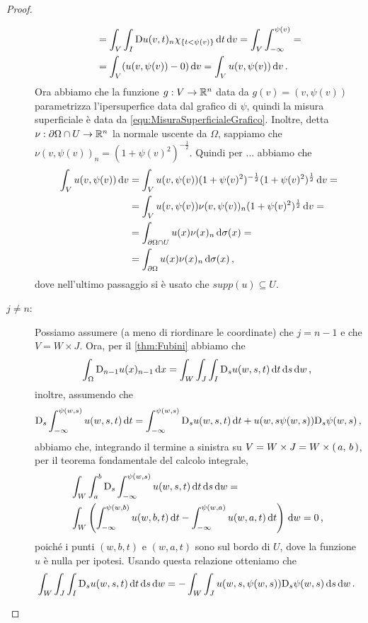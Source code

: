\begin{proof}
\begin{description}
\begin{align*}
				& = \int_V \int_I \mathrm D u(v,t)_n \chi_{\{t<\psi(v)\}} \,\mathrm d t \,\mathrm d v = \int_V \int_{-\infty}^{\psi(v)} = \\
				& = \int_V (u(v,\psi(v)) - 0) \,\mathrm d v = \int_V u(v,\psi(v)) \,\mathrm d v\, \text{. }
			\end{align*}
			Ora abbiamo che la funzione $g:V\rightarrow \mathbb R^n$ data da $g(v)=(v,\psi(v))$ parametrizza l'ipersuperfice data dal grafico di
			$\psi$, quindi la misura superficiale è data da \cref{equ:MisuraSuperficialeGrafico}.
			Inoltre, detta $\nu:\partial \Omega \cap U \rightarrow \mathbb R^n$ la normale uscente da $\Omega$, sappiamo che
			$\nu(v,\psi(v))_n=(1+\psi(v)^2)^{-\frac{1}{2}}$. Quindi per ... abbiamo che
			\begin{align*}
				\int_V u(v,\psi(v)) \,\mathrm d v &= \int_V u(v,\psi(v)) (1+\psi(v)^2)^{-\frac{1}{2}} (1+\psi(v)^2)^{\frac{1}{2}} \,\mathrm d v = \\
				& = \int_V u(v,\psi(v)) \nu(v,\psi(v))_n (1+\psi(v)^2)^{\frac{1}{2}} \,\mathrm d v = \\
				& = \int_{\partial \Omega \cap U} u(x) \nu(x)_n \,\mathrm d \sigma(x) = \\
				& = \int_{\partial \Omega} u(x) \nu(x)_n \,\mathrm d \sigma(x)\, \text{, }
			\end{align*}
			dove nell'ultimo passaggio si è usato che $supp(u)\subseteq U$.
		\item [$j\neq n$:] Possiamo assumere (a meno di riordinare le coordinate) che $j=n-1$ e che $V=W \times J$. Ora, per il
			\cref{thm:Fubini} abbiamo che
			\[
				\int_{\Omega} \mathrm D_{n-1} u(x)_{n-1} \,\mathrm d x = \int_W \int_J \int_I \mathrm D_s u(w,s,t) \,\mathrm d t \,\mathrm d s \,\mathrm d w\, \text{, }
			\]
			inoltre, assumendo che
			\[
				\mathrm D_s \int_{-\infty}^{\psi(w,s)} u(w,s,t) \,\mathrm d t =
				\int_{-\infty}^{\psi(w,s)} \mathrm D_s u(w,s,t) \,\mathrm d t + u(w,s\psi(w,s))\mathrm D_s \psi (w,s)\, \text{, }
			\]
			abbiamo che, integrando il termine a sinistra su $V=W\times J=W\times \left(\,a,\,b\,\right)$, per il teorema fondamentale del
			calcolo integrale,
			\begin{align*}
				&\int_W \int_a^b \mathrm D_s \int_{-\infty}^{\psi(w,s)} u(w,s,t) \,\mathrm d t \,\mathrm d s \,\mathrm d w = \\
				&\int_W \left(\int_{-\infty}^{\psi(w,b)} u(w,b,t) \,\mathrm d t - \int_{-\infty}^{\psi(w,a)} u(w,a,t) \,\mathrm d t\right) \,\mathrm d w
				= 0\, \text{, }
			\end{align*}
			poiché i punti $(w,b,t)$ e $(w,a,t)$ sono sul bordo di $U$, dove la funzione $u$ è nulla per ipotesi. Usando questa relazione
			otteniamo che
			\[
				\int_W\int_J\int_I\mathrm D_s u(w,s,t) \,\mathrm d t \,\mathrm d s \,\mathrm d w =-\int_W \int_J u(w,s,\psi(w,s))\mathrm D_s \psi (w,s)\,\mathrm d s\,\mathrm d w\, \text{. }
\]
\end{description}
\end{proof}
